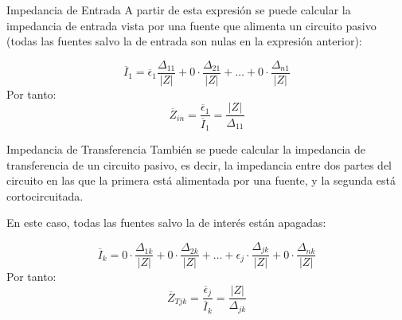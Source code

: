 \documentclass[aspectratio=169, usenames,svgnames,dvipsnames]{beamer}
\begin{document}
\begin{frame}[label={sec:org9ef12a5}]{Impedancia de Entrada}
A partir de esta expresión se puede calcular la impedancia de entrada vista por una fuente que alimenta un circuito pasivo (todas las fuentes salvo la de entrada son nulas en la expresión anterior):

\[
  \overline{I}_1 = \overline{\epsilon}_1 \frac{\Delta_{11}}{|Z|} + 0 \cdot \frac{\Delta_{21}}{|Z|} + \dots + 0 \cdot \frac{\Delta_{n1}}{|Z|}
\]
Por tanto:
\[
  \boxed{\overline{Z}_{in} = \frac{\overline{\epsilon}_1}{\overline{I}_1}=  \frac{|Z|}{\Delta_{11}}}
\]
\end{frame}

\begin{frame}[label={sec:org994e49d}]{Impedancia de Transferencia}
También se puede calcular la impedancia de transferencia de un circuito pasivo, es decir, la impedancia entre dos partes del circuito en las que la primera está alimentada por una fuente, y la segunda está cortocircuitada.

En este caso, todas las fuentes salvo la de interés están apagadas:

\[
  \overline{I}_k = 0 \cdot \frac{\Delta_{1k}}{|Z|} + 0 \cdot \frac{\Delta_{2k}}{|Z|} + \dots + \epsilon_j \cdot \frac{\Delta_{jk}}{|Z|} + 0 \cdot \frac{\Delta_{nk}}{|Z|}
\]
Por tanto:
\[
  \boxed{\overline{Z}_{Tjk} = \frac{\overline{\epsilon}_j}{\overline{I}_k}=  \frac{|Z|}{\Delta_{jk}}}
\]
\end{frame}
\end{document}
